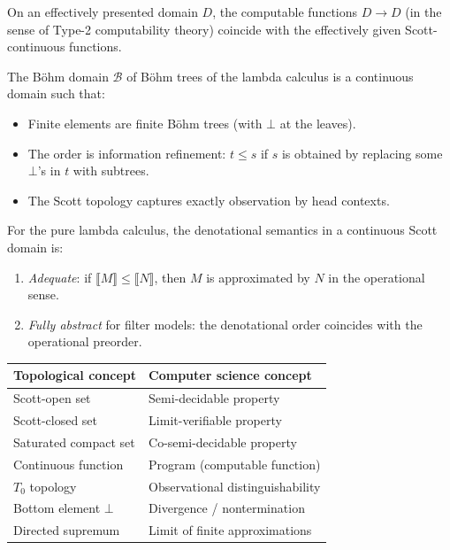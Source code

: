 \begin{theorem}
On an effectively presented domain $D$, the computable functions $D \to D$ (in the sense
of Type-2 computability theory) coincide with the effectively given Scott-continuous
functions.
\end{theorem}

\begin{proposition}
The B\"ohm domain $\mathcal{B}$ of B\"ohm trees of the lambda calculus is a continuous
domain such that:
\begin{itemize}
  \item Finite elements are finite B\"ohm trees (with $\bot$ at the leaves).
  \item The order is information refinement: $t \leq s$ if $s$ is obtained by replacing
    some $\bot$'s in $t$ with subtrees.
  \item The Scott topology captures exactly observation by head contexts.
\end{itemize}
\end{proposition}

\begin{theorem}
For the pure lambda calculus, the denotational semantics in a continuous Scott domain is:
\begin{enumerate}
  \item \emph{Adequate}: if $\llbracket M \rrbracket \leq \llbracket N \rrbracket$, then
    $M$ is approximated by $N$ in the operational sense.
  \item \emph{Fully abstract} for filter models: the denotational order coincides with the
    operational preorder.
\end{enumerate}
\end{theorem}

\begin{keyformulas}[title=\textbf{Topology--computer science correspondence}]
\begin{center}
\renewcommand{\arraystretch}{1.3}
\begin{tabular}{|l|l|}
\hline
\textbf{Topological concept} & \textbf{Computer science concept} \\
\hline
Scott-open set & Semi-decidable property \\
Scott-closed set & Limit-verifiable property \\
Saturated compact set & Co-semi-decidable property \\
Continuous function & Program (computable function) \\
$T_0$ topology & Observational distinguishability \\
Bottom element $\bot$ & Divergence / nontermination \\
Directed supremum & Limit of finite approximations \\
\hline
\end{tabular}
\end{center}
\end{keyformulas}

